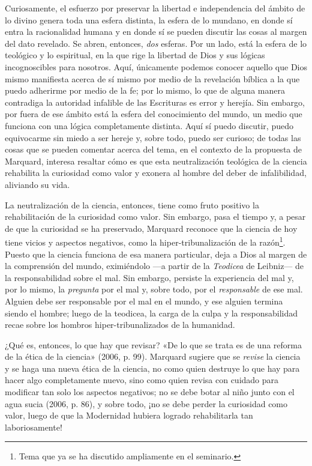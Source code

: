 \begin{refsection}
Curiosamente, el esfuerzo por preservar la libertad e independencia del ámbito de lo divino genera toda una esfera distinta, la esfera de lo mundano, en donde sí entra la racionalidad humana y en donde sí se pueden discutir las cosas al margen del dato revelado. Se abren, entonces, \emph{dos} esferas. Por un lado, está la esfera de lo teológico y lo espiritual, en la que rige la libertad de Dios y sus lógicas incognoscibles para nosotros. Aquí, únicamente podemos conocer aquello que Dios mismo manifiesta acerca de sí mismo por medio de la revelación bíblica a la que puedo adherirme por medio de la fe; por lo mismo, lo que de alguna manera contradiga la autoridad infalible de las Escrituras es error y herejía. Sin embargo, por fuera de ese ámbito está la esfera del conocimiento del mundo, un medio que funciona con una lógica completamente distinta. Aquí sí puedo discutir, puedo equivocarme sin miedo a ser hereje y, sobre todo, puedo ser curioso; de todas las cosas que se pueden comentar acerca del tema, en el contexto de la propuesta de Marquard, interesa resaltar cómo es que esta neutralización teológica de la ciencia rehabilita la curiosidad como valor y exonera al hombre del deber de infalibilidad, aliviando su vida.

La neutralización de la ciencia, entonces, tiene como fruto positivo la rehabilitación de la curiosidad como valor. Sin embargo, pasa el tiempo y, a pesar de que la curiosidad se ha preservado, Marquard reconoce que la ciencia de hoy tiene vicios y aspectos negativos, como la hiper-tribunalización de la razón\footnote{Tema que ya se ha discutido ampliamente en el seminario.}. Puesto que la ciencia funciona de esa manera particular, deja a Dios al margen de la comprensión del mundo, eximiéndolo ---a partir de la \emph{Teodicea} de Leibniz--- de la responsabilidad sobre el mal. Sin embargo, persiste la experiencia del mal y, por lo mismo, la \emph{pregunta} por el mal y, sobre todo, por el \emph{responsable} de ese mal. Alguien debe ser responsable por el mal en el mundo, y ese alguien termina siendo el hombre; luego de la teodicea, la carga de la culpa y la responsabilidad recae sobre los hombros hiper-tribunalizados de la humanidad.

¿Qué es, entonces, lo que hay que revisar? «De lo que se trata es de una reforma de la ética de la ciencia» (2006, p. 99). Marquard sugiere que se \emph{revise} la ciencia y se haga una nueva ética de la ciencia, no como quien destruye lo que hay para hacer algo completamente nuevo, sino como quien revisa con cuidado para modificar tan solo los aspectos negativos; no se debe botar al niño junto con el agua sucia (2006, p. 86), y sobre todo, ¡no se debe perder la curiosidad como valor, luego de que la Modernidad hubiera logrado rehabilitarla tan laboriosamente!


\end{refsection}
